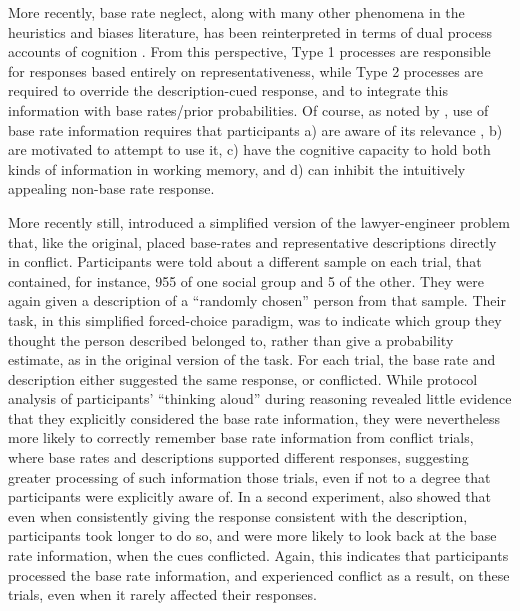 More recently, base rate neglect,
along with many other phenomena in the heuristics and biases literature,
has been reinterpreted in terms of dual process accounts of cognition
\citep[see][]{Kahneman2005,Kahneman2002,Kahneman2011,Barbey2007}.
From this perspective, Type 1 processes are responsible for responses
based entirely on representativeness,
while Type 2 processes are required to override the description-cued response,
and to integrate this information with base rates/prior probabilities.
Of course, as noted by \citet{Stanovich2000},
use of base rate information requires that participants
a) are aware of its relevance \citep[see also][]{Bar-Hillel1980},
b) are motivated to attempt to use it,
c) have the cognitive capacity to hold
both kinds of information in working memory, and
d) can inhibit the intuitively appealing non-base rate response.

More recently still, \citet{DeNeys2008} introduced
a simplified version of the lawyer-engineer problem
that, like the original, placed base-rates
and representative descriptions directly in conflict.
Participants were told about a different sample on each trial,
that contained, for instance, 955 of one social group and 5 of the other.
They were again given a description of a ``randomly chosen'' person from that sample.
Their task, in this simplified forced-choice paradigm,
was to indicate which group they thought the person described belonged to,
rather than give a probability estimate,
as in the original version of the task.
For each trial, the base rate and description either
suggested the same response, or conflicted.
While protocol analysis of participants' ``thinking aloud''
during reasoning revealed little evidence that they
explicitly considered the base rate information,
they were nevertheless more likely to correctly remember
base rate information from conflict trials,
where base rates and descriptions supported different responses,
suggesting greater processing of such information those trials,
even if not to a degree that participants were explicitly aware of.
In a second experiment, \citet{DeNeys2008} also showed that
even when consistently giving the response consistent with the description,
participants took longer to do so, and were more likely 
to look back at the base rate information, when the cues conflicted.
Again, this indicates that participants processed the base rate information,
and experienced conflict as a result,
on these trials, even when it rarely affected their responses.

